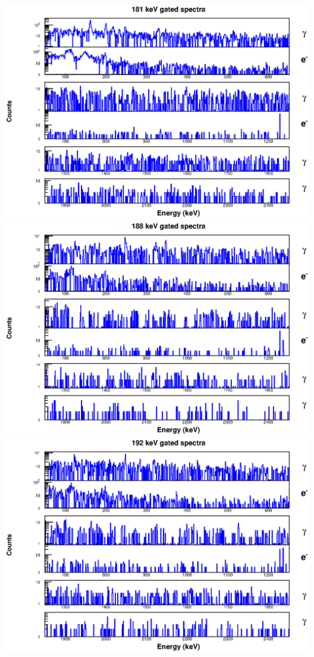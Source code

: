 \begin{landscape}
\includegraphics[scale=1.1]{154Gd_Appendix/181_combined.eps}
\includegraphics[scale=1.1]{154Gd_Appendix/188_combined.eps}
\includegraphics[scale=1.1]{154Gd_Appendix/192_combined.eps}

\end{landscape}
